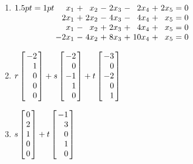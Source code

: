 \begin{multicols}{2}
\begin{ex}
\begin{enumerate}[label={\alph*.}]
\item 
$\arraycolsep=1pt
\begin{array}[t]{rlrlrlrlrcr}
	 x_1 & + &  x_2 & - & 2x_3 & - & 2x_4 & + & 2x_5 & = & 0 \\
	2x_1 & + & 2x_2 & - & 4x_3 & - & 4x_4 & + &  x_5 & = & 0 \\
	 x_1 & - &  x_2 & + & 2x_3 & + & 4x_4 & + &  x_5 & = & 0 \\
	-2x_1 & - & 4x_2 & + & 8x_3 & + &10x_4 & + &  x_5 & = & 0
\end{array}$

\end{enumerate}
\begin{sol}
\begin{enumerate}[label={\alph*.}]
\setcounter{enumi}{1}
\item  
$r \leftB \begin{array}{r}
	-2 \\
	1 \\
	0 \\
	0 \\
	0
\end{array} \rightB
+ s
\leftB \begin{array}{r}
	-2 \\
	0 \\
	-1 \\
	1 \\
	0
\end{array} \rightB
+ t
\leftB \begin{array}{r}
	-3 \\
	0 \\
	-2 \\
	0 \\
	1
\end{array} \rightB$

\setcounter{enumi}{3}
\item 
$s \leftB \begin{array}{r}
	0 \\
	2 \\
	1 \\
	0 \\
	0
\end{array} \rightB
+ t
\leftB \begin{array}{r}
	-1 \\
	3 \\
	0 \\
	1 \\
	0
\end{array} \rightB$
\end{enumerate}
\end{sol}
\end{ex}


\end{multicols}
